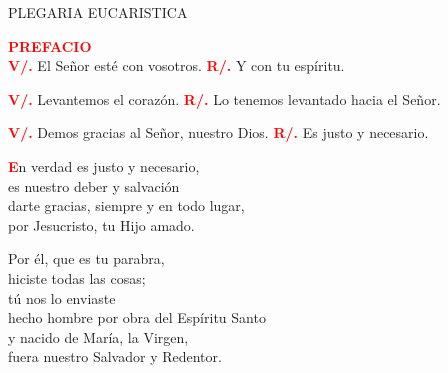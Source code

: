 \documentclass[12pt, letterpaper]{report}
\begin{document}
\begin{center}
\Large PLEGARIA EUCARISTICA
\end{center}

\Large {\bfseries \textcolor{red}{PREFACIO}} \newline \\

\Large \hspace{-0.9cm} {\bfseries \textcolor{red}{V/.}} \hspace{0.5cm} El Se\~nor est\'e con vosotros. \newline
\Large \hspace{-0.9cm} {\bfseries \textcolor{red}{R/.}} \hspace{0.5cm} Y con tu esp\'iritu. \newline

\Large \hspace{-0.9cm} {\bfseries \textcolor{red}{V/.}} \hspace{0.5cm} Levantemos el coraz\'on. \newline
\Large \hspace{-0.9cm} {\bfseries \textcolor{red}{R/.}} \hspace{0.5cm} Lo tenemos levantado hacia el Se\~nor. \newline

\Large \hspace{-0.9cm} {\bfseries \textcolor{red}{V/.}} \hspace{0.5cm} Demos gracias al Se\~nor, nuestro Dios. \newline
\Large \hspace{-0.9cm} {\bfseries \textcolor{red}{R/.}} \hspace{0.5cm} Es justo y necesario.

\lettrine[lines=1]{\bfseries \textcolor{red}{E}}{}\Large n verdad es justo y necesario, \\
es nuestro deber y salvaci\'on \\
darte gracias, siempre y en todo lugar, \\
por Jesucristo, tu Hijo amado. \newline

Por \'el, que es tu parabra, \\
hiciste todas las cosas; \\
t\'u nos lo enviaste \\
hecho hombre por obra del Esp\'iritu Santo \\
y nacido de Mar\'ia, la Virgen, \\
fuera nuestro Salvador y Redentor. \newline
\end{document}

